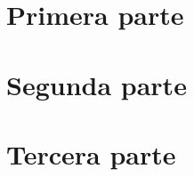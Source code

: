 



\nocite{*} %

\hypersetup{pageanchor=false}
\frontmatter
	\myCover
	\setcounter{page}{0}
	
	
	

	\hypersetup{pageanchor=true}
	\tableofcontents

\mainmatter
	\part{Primera parte}
	
	
	
	
	\part{Segunda parte}
	
	
	
	
	\part{Tercera parte}
	

\backmatter
	
	\myBackCover

